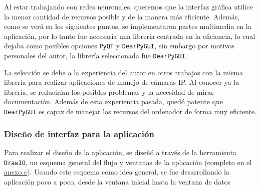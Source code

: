 Al estar trabajando con redes neuronales, queremos que la interfaz gráfica utilice la menor cantidad de recursos posible y de la manera más eficiente. Además, como se verá en los siguientes puntos, 
se implementaron partes multimedia en la aplicación, por lo tanto fue necesaria una librería centrada en la eficiencia, lo cual dejaba como posibles opciones 
\texttt{PyQT} y \texttt{DearPyGUI}, sin embargo por motivos personales del autor, la librería seleccionada fue \texttt{DearPyGUI}.

La selección se debe a la experiencia del autor en otros trabajos con la misma librería para realizar aplicaciones de manejo de cámaras IP. Al conocer ya la librería, se reducirían 
los posibles problemas y la necesidad de mirar documentación. Además de esta experiencia pasada, quedó patente que \texttt{DearPyGUI} es capaz de manejar los recursos del ordenador de forma muy eficiente.

\clearpage
\subsubsection{Diseño de interfaz para la aplicación}

Para realizar el diseño de la aplicación, se diseñó a través de la herramienta \texttt{DrawIO}, un esquema general del flujo y ventanas de la aplicación (completo en el \hyperref[esquema:FlujoVentanas]{anexo c}).\newline
Usando este esquema como idea general, se fue desarrollando la aplicación poco a poco, desde la ventana inicial hasta la ventana de datos

